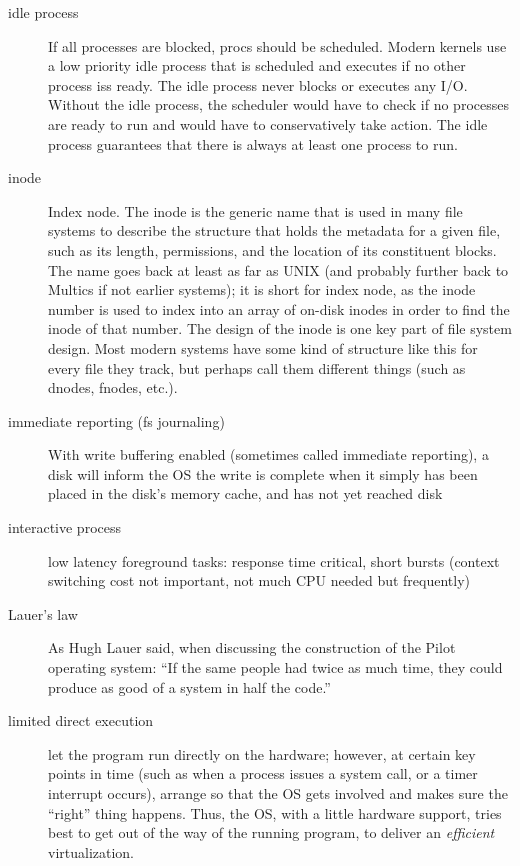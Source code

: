 \begin{description}
\item[idle process] If all processes are blocked,  procs should be scheduled. Modern kernels use a low priority idle process that is scheduled and executes if no other process iss ready. The idle process never blocks or executes any I/O. Without the idle process, the scheduler would have to check if no processes are ready to run and would have to conservatively take action. The idle process guarantees that there is always at least one process to run.

\item[inode] Index node. The inode is the generic name that is used in many file systems to describe the structure that holds the metadata for a given file, such as its length, permissions, and the location of its constituent blocks. The name
goes back at least as far as UNIX (and probably further back to Multics if not earlier systems); it is short for index node, as the inode number is used to index into an array of on-disk inodes in order to find the inode of that number. The design of the inode is one key part of file system design. Most modern systems have some kind of structure like this for every file they track, but perhaps call them different things (such as dnodes, fnodes, etc.).

\item[immediate reporting (fs journaling)] With write buffering enabled (sometimes called immediate reporting), a disk will inform the OS the write is complete when it simply has been placed in the disk’s memory cache, and has not yet reached disk

\item[interactive process] low latency foreground tasks: response time critical, short bursts (context switching cost not important, not much CPU needed but frequently)

\item[Lauer's law] As Hugh Lauer said, when discussing the construction of the Pilot operating system: ``If the same people had twice as much time, they could produce as good of a system in half the code.''

\item[limited direct execution] let the program run directly on the hardware; however, at certain key points in time (such as when a process issues a system call, or a timer interrupt occurs), arrange so that the OS gets involved and makes sure the ``right'' thing happens.   Thus, the OS, with a little hardware support, tries best to get out of the way of the running program, to deliver an \emph{efficient} virtualization.


\end{description}
